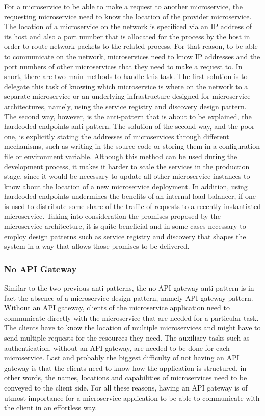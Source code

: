 \documentclass{Configuration_Files/PoliMi3i_thesis}
\begin{document}
For a microservice to be able to make a request to another microservice, the requesting microservice need to know the location of the provider microservice.
The location of a microservice on the network is specificed via an IP address of its host and also a port number that is allocated for the process by the host in order to route network packets to the related process.
For that reason, to be able to communicate on the network, microservices need to know IP addresses and the port numbers of other microservices that they need to make a request to.
In short, there are two main methods to handle this task.
The first solution is to delegate this task of knowing which microservice is where on the network to a separate microservice or an underlying infrastructure designed for microservice architectures, namely, using the service registry and discovery design pattern.
The second way, however, is the anti-pattern that is about to be explained, the hardcoded endpoints anti-pattern.
The solution of the second way, and the poor one, is explicitly stating the addresses of microservices through different mechanisms, such as writing in the source code or storing them in a configuration file or environment variable.
Although this method can be used during the development process, it makes it harder to scale the services in the production stage, since it would be necessary to update all other microservice instances to know about the location of a new microservice deployment.
In addition, using hardcoded endpoints undermines the benefits of an internal load balancer, if one is used to distribute some share of the traffic of requests to a recently instantiated microservice.
Taking into consideration the promises proposed by the microservice architecture, it is quite beneficial and in some cases necessary to employ design patterns such as service registry and discovery that shapes the system in a way that allows those promises to be delivered.

\subsubsection{No API Gateway}
\label{subsubsec:no_api_gateway}

Similar to the two previous anti-patterns, the no API gateway anti-pattern is in fact the absence of a microservice design pattern, namely API gateway pattern.
Without an API gateway, clients of the microservice application need to communicate directly with the microservice that are needed for a particular task.
The clients have to know the location of multiple microservices and might have to send multiple requests for the resources they need.
The auxiliary tasks such as authentication, without an API gateway, are needed to be done for each microservice.
Last and probably the biggest difficulty of not having an API gateway is that the clients need to know how the application is structured, in other words, the names, locations and capabilities of microservices need to be conveyed to the client side.
For all these reasons, having an API gateway is of utmost importance for a microservice application to be able to communicate with the client in an effortless way.
\end{document}
